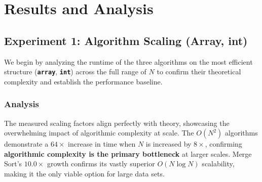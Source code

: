 \documentclass[11pt, a4paper]{article}
\begin{document}
\section{Results and Analysis}

\subsection{Experiment 1: Algorithm Scaling (Array, int)}
We begin by analyzing the runtime of the three algorithms on the most efficient structure (\textbf{\texttt{array}}, \textbf{\texttt{int}}) across the full range of $N$ to confirm their theoretical complexity and establish the performance baseline.

\subsubsection{Analysis}
The measured scaling factors align perfectly with theory, showcasing the overwhelming impact of algorithmic complexity at scale. The $O(N^2)$ algorithms demonstrate a $64\times$ increase in time when $N$ is increased by $8\times$, confirming \textbf{algorithmic complexity is the primary bottleneck} at larger scales. Merge Sort's $10.0\times$ growth confirms its vastly superior $O(N \log N)$ scalability, making it the only viable option for large data sets.
\end{document}
